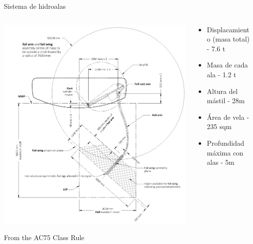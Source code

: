 \documentclass[presentation,aspectratio=169]{beamer}
\begin{document}
\begin{frame}[label={sec:org40cbbe9}]{Sistema de hidroalas}
\begin{columns}
\begin{column}{0.5\columnwidth}
\begin{center}
\includegraphics[height=0.8\textheight]{../../figures/AC75-class-foil.png}
\end{center}

{\footnotesize From the AC75 Class Rule}
\end{column}
\begin{column}{0.5\columnwidth}
\begin{itemize}
\item Displacamiento (masa total) - 7.6 t
\item Masa de cada ala - 1.2 t
\item Altura del mástil - 28m
\item Área de vela - 235 sqm
\item Profundidad máxima con alas - 5m
\end{itemize}
\end{column}
\end{columns}
\end{frame}
\end{document}
